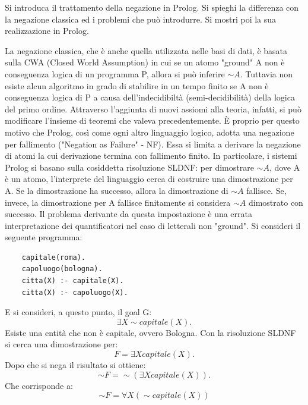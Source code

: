 \documentclass[answers, a4paper, 11pt]{exam}
\begin{document}
\begin{questions}
\question Si introduca il trattamento della negazione in Prolog. Si spieghi la differenza con la negazione
classica ed i problemi che può introdurre. Si mostri poi la sua realizzazione in Prolog.
\begin{solution}
  La negazione classica, che è anche quella utilizzata nelle basi di dati, è basata sulla CWA (Closed World Assumption) in cui se un atomo "ground" A non è conseguenza logica di un programma P, allora si può inferire $\sim A$.
  Tuttavia non esiste alcun algoritmo in grado di stabilire in un tempo finito se A non è conseguenza logica di P a causa dell'indecidibiltà (semi-decidibilità) della logica del primo ordine. Attraverso l'aggiunta di nuovi assiomi alla teoria, infatti, si può modificare l'insieme di teoremi che valeva precedentemente.
  È proprio per questo motivo che Prolog, così come ogni altro linguaggio logico, adotta una negazione per fallimento ("Negation as Failure" - NF). Essa si limita a derivare la negazione di atomi la cui derivazione termina con fallimento finito.
  In particolare, i sistemi Prolog si basano sulla cosiddetta risoluzione SLDNF: per dimostrare $\sim A$, dove A è un atomo, l'interprete del linguaggio cerca di costruire una dimostrazione per A.
  Se la dimostrazione ha successo, allora la dimostrazione di $\sim A$ fallisce. Se, invece, la dimostrazione per A fallisce finitamente si considera $\sim A$ dimostrato con successo.
  Il problema derivante da questa impostazione è una errata interpretazione dei quantificatori nel caso di letterali non "ground".
  Si consideri il seguente programma:
  \begin{verbatim}
    capitale(roma).
    capoluogo(bologna).
    citta(X) :- capitale(X).
    citta(X) :- capoluogo(X).
  \end{verbatim}
  E si consideri, a questo punto, il goal G:
  \begin{equation*}
    \exists X \sim capitale(X).
  \end{equation*}
  Esiste una entità che non è capitale, ovvero Bologna.
  Con la risoluzione SLDNF si cerca una dimostrazione per:
  \begin{equation*}
    F = \exists X capitale(X).
  \end{equation*}
  Dopo che si nega il risultato si ottiene:
  \begin{equation*}
    \sim F = \sim(\exists X capitale(X)).
  \end{equation*}
  Che corrisponde a:
  \begin{equation*}
    \sim F = \forall X (\sim capitale(X))

\end{equation*}
\end{solution}
\end{questions}
\end{document}

